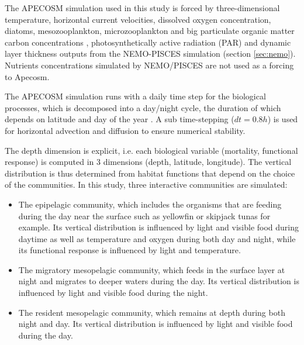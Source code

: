 

The APECOSM simulation used in this study is forced by three-dimensional temperature, horizontal current velocities, dissolved oxygen concentration, diatoms, mesozooplankton, microzooplankton and big particulate organic matter carbon concentrations \citep{aumontPISCESv2OceanBiogeochemical2015}, photosynthetically active radiation (PAR) and dynamic layer thickness outputs from the NEMO-PISCES simulation (section \ref{sec:nemo}). Nutrients concentrations simulated by NEMO/PISCES are not used as a forcing to Apecosm.

The APECOSM simulation runs with a daily time step for the biological processes, which is decomposed into a day/night cycle, the duration of which  depends on latitude and day of the year \citep{forsytheModelComparisonDaylength1995}. A sub time-stepping ($dt =0.8h$) is used for horizontal advection and diffusion to ensure numerical stability.

The depth dimension is explicit, i.e. each biological variable (mortality, functional response) is computed in 3 dimensions (depth, latitude, longitude). The vertical distribution is thus determined from habitat functions that depend on the choice of the communities. In this study, three interactive communities are simulated:
\begin{itemize}
\item{The epipelagic community, which includes the organisms that are feeding during the day near the surface such as yellowfin or skipjack tunas for example. Its vertical distribution is influenced by light and visible food during daytime as well as temperature and oxygen during both day and night, while its functional response is influenced by light and temperature.}
\item{The migratory mesopelagic community, which feeds in the surface layer at night and migrates to deeper waters during the day. Its vertical distribution is influenced by light and visible food during the night.}
\item{The resident mesopelagic community, which remains at depth during both night and day. Its vertical distribution is influenced by light and visible food during the day.}
\end{itemize}


